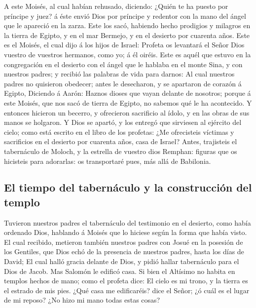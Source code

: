  A este Moisés, al cual habían rehusado, diciendo: ¿Quién
te ha puesto por príncipe y juez? á éste envió Dios por príncipe y
redentor con la mano del ángel que le apareció en la zarza.
 Este los sacó, habiendo hecho prodigios y milagros en la
tierra de Egipto, y en el mar Bermejo, y en el desierto por cuarenta
años.  Este es el Moisés, el cual dijo á los hijos de
Israel: Profeta os levantará el Señor Dios vuestro de vuestros hermanos,
como yo; á él oiréis.  Este es aquél que estuvo en la
congregación en el desierto con el ángel que le hablaba en el monte
Sina, y con nuestros padres; y recibió las palabras de vida para darnos:
 Al cual nuestros padres no quisieron obedecer; antes le
desecharon, y se apartaron de corazón á Egipto,  Diciendo
á Aarón: Haznos dioses que vayan delante de nosotros; porque á este
Moisés, que nos sacó de tierra de Egipto, no sabemos qué le ha
acontecido.  Y entonces hicieron un becerro, y ofrecieron
sacrificio al ídolo, y en las obras de sus manos se holgaron.
 Y Dios se apartó, y los entregó que sirviesen al
ejército del cielo; como está escrito en el libro de los profetas: ¿Me
ofrecisteis víctimas y sacrificios en el desierto por cuarenta años,
casa de Israel?  Antes, trajisteis el tabernáculo de
Moloch, y la estrella de vuestro dios Remphan: figuras que os hicisteis
para adorarlas: os transportaré pues, más allá de Babilonia.

\hypertarget{el-tiempo-del-tabernuxe1culo-y-la-construcciuxf3n-del-templo}{%
\subsection{El tiempo del tabernáculo y la construcción del
templo}\label{el-tiempo-del-tabernuxe1culo-y-la-construcciuxf3n-del-templo}}

 Tuvieron nuestros padres el tabernáculo del testimonio
en el desierto, como había ordenado Dios, hablando á Moisés que lo
hiciese según la forma que había visto.  El cual
recibido, metieron también nuestros padres con Josué en la posesión de
los Gentiles, que Dios echó de la presencia de nuestros padres, hasta
los días de David;  El cual halló gracia delante de Dios,
y pidió hallar tabernáculo para el Dios de Jacob.  Mas
Salomón le edificó casa.  Si bien el Altísimo no habita
en templos hechos de mano; como el profeta dice:  El
cielo es mi trono, y la tierra es el estrado de mis pies. ¿Qué casa me
edificaréis? dice el Señor; ¿ó cuál es el lugar de mi reposo?
 ¿No hizo mi mano todas estas cosas?


